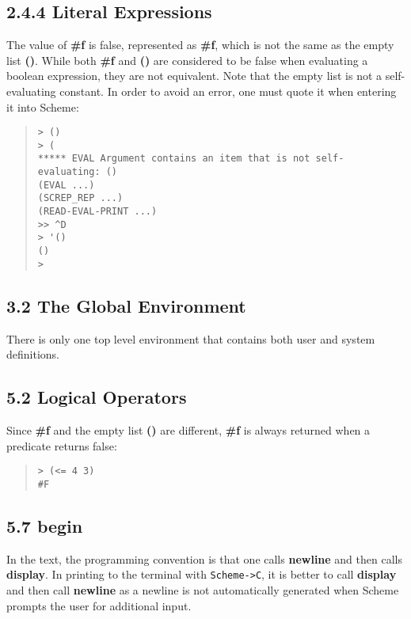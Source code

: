 \documentclass[10pt]{article}
\begin{document}
\subsection*{2.4.4 Literal Expressions}

The value of \textbf{\#f} is false, represented as \textbf{\#f}, which is
not the same as the empty list \textbf{()}.  While both \textbf{\#f} and
\textbf{()} are considered to be false when evaluating a boolean
expression, they are not equivalent.  Note that the empty list
is not a self-evaluating constant.  In order to avoid an
error, one must quote it when entering it into Scheme:

\begin{quote}
\begin{verbatim}
> ()
> (
***** EVAL Argument contains an item that is not self-evaluating: ()
(EVAL ...)
(SCREP_REP ...)
(READ-EVAL-PRINT ...)
>> ^D
> '()
()
>
\end{verbatim}
\end{quote}

\subsection*{3.2 The Global Environment}

There is only one top level environment that contains both
user and system definitions.

\subsection*{5.2 Logical Operators}

Since \textbf{\#f} and the empty list \textbf{()} are different, \textbf{\#f} is
always returned when a predicate returns false:

\begin{quote}
\begin{verbatim}
> (<= 4 3)
#F
\end{verbatim}
\end{quote}

\subsection*{5.7 begin}

In the text, the programming convention is that one calls
\textbf{newline} and then calls \textbf{display}.  In printing to the
terminal with \texttt{Scheme->C}, it is better to call \textbf{display} and
then call \textbf{newline} as a newline is not automatically
generated when Scheme prompts the user for additional input.
\end{document}
